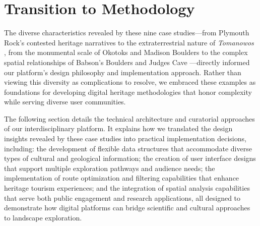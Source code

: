 \section{Transition to Methodology}
\label{sec:transition}

The diverse characteristics revealed by these nine case studies—from Plymouth Rock's contested heritage narratives \cite{Seelye1997} to the extraterrestrial nature of \emph{Tomanowos} \cite{AMNHWillamette}, from the monumental scale of Okotoks \cite{AlbertaOkotoks} and Madison Boulders \cite{NHMadisonBoulder} to the complex spatial relationships of Babson's Boulders \cite{wburMysteriousBoulders} and Judges Cave \cite{Dana1891}—directly informed our platform's design philosophy and implementation approach. Rather than viewing this diversity as complications to resolve, we embraced these examples as foundations for developing digital heritage methodologies that honor complexity while serving diverse user communities.

The following section details the technical architecture and curatorial approaches of our interdisciplinary platform. It explains how we translated the design insights revealed by these case studies into practical implementation decisions, including: the development of flexible data structures that accommodate diverse types of cultural and geological information; the creation of user interface designs that support multiple exploration pathways and audience needs; the implementation of route optimization and filtering capabilities that enhance heritage tourism experiences; and the integration of spatial analysis capabilities that serve both public engagement and research applications, all designed to demonstrate how digital platforms can bridge scientific and cultural approaches to landscape exploration.

